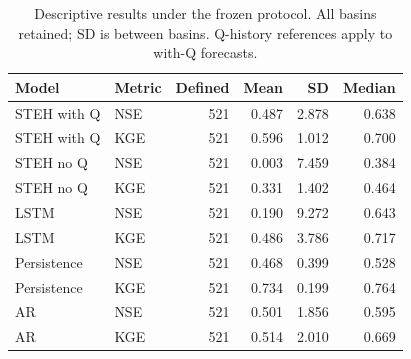 \begin{table}
\caption{Descriptive results under the frozen protocol. All basins retained; SD is between basins. Q-history references apply to with-Q forecasts.}
\label{tab:publication_model_table}
\begin{tabular}{llrrrr}
\toprule
Model & Metric & Defined & Mean & SD & Median \\
\midrule
STEH with Q & NSE & 521 & 0.487 & 2.878 & 0.638 \\
STEH with Q & KGE & 521 & 0.596 & 1.012 & 0.700 \\
STEH no Q & NSE & 521 & 0.003 & 7.459 & 0.384 \\
STEH no Q & KGE & 521 & 0.331 & 1.402 & 0.464 \\
LSTM & NSE & 521 & 0.190 & 9.272 & 0.643 \\
LSTM & KGE & 521 & 0.486 & 3.786 & 0.717 \\
Persistence & NSE & 521 & 0.468 & 0.399 & 0.528 \\
Persistence & KGE & 521 & 0.734 & 0.199 & 0.764 \\
AR & NSE & 521 & 0.501 & 1.856 & 0.595 \\
AR & KGE & 521 & 0.514 & 2.010 & 0.669 \\
\bottomrule
\end{tabular}
\end{table}
